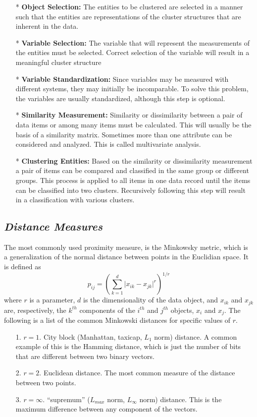 \begin{itemize}
\item[*]\textbf{Object Selection:} The entities to be clustered are selected in a manner such that the entities are representations of the cluster structures that are inherent in the data.
\item[*]\textbf{Variable Selection:} The variable that will represent the measurements of the entities must be selected.  Correct selection of the variable will result in a meaningful cluster structure
\item[*]\textbf{Variable Standardization:} Since variables may be measured with different systems, they may initially be incomparable.  To solve this problem, the variables are usually standardized, although this step is optional.
\item[*]\textbf{Similarity Measurement:} Similarity or dissimilarity between a pair of data items or among many items must be calculated.  This will usually be the basis of a similarity matrix.  Sometimes more than one attribute can be considered and analyzed.  This is called multivariate analysis.
\item[*]\textbf{Clustering Entities:} Based on the similarity or dissimilarity measurement a pair of items can be compared and classified in the same group or different groups.  This process is applied to all items in one data record until the items can be classified into two clusters.  Recursively following this step will result in a classification with various clusters.
\end{itemize}
\subsection{\textit{Distance Measures}}
The most commonly used proximity measure, is the Minkowsky metric, which is a generalization of the normal distance between points in the Euclidian space.  It is defined as
$$p_{ij}=\left(\sum_{k=1}^{d}\vert x_{ik}-x_{jk}\vert^{r}\right)^{1/r}$$
where $r$ is a parameter, $d$ is the dimensionality of the data object, and $x_{ik}$ and $x_{jk}$ are, respectively, the $k^{th}$ components of the $i^{th}$ and $j^{th}$ objects, $x_{i}$ and $x_{j}$.
The following is a list of the common Minkowski distances for specific values of $r$.
\begin{itemize}
\item[1.] $r=1$. City block (Manhattan, taxicap, $L_{1}$ norm) distance.  A common example of this is the Hamming distance, which is just the number of bits that are different between two binary vectors.
\item[2.] $r=2$. Euclidean distance.  The most common measure of the distance between two points.
\item[3.] $r=\infty$. ``supremum'' ($L_{max}$ norm, $L_{\infty}$ norm) distance.  This is the maximum difference between any component of the vectors.
\end{itemize}
